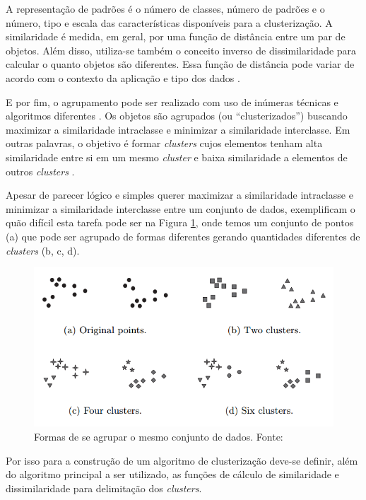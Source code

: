 A representação de padrões é o número de classes, número de padrões e o número, tipo e escala
das características disponíveis para a clusterização.
A similaridade é medida, em geral, por uma função de distância entre um par de objetos. Além disso, utiliza-se também
o conceito inverso de dissimilaridade para calcular o quanto objetos são diferentes. Essa função de distância pode variar de acordo 
com o contexto da aplicação e tipo dos dados \cite{clustering_review}. 

E por fim, o agrupamento pode ser realizado com uso de inúmeras técnicas e algoritmos diferentes \cite{clustering_review}.
Os objetos são agrupados (ou ``clusterizados'') buscando maximizar a similaridade intraclasse e minimizar a similaridade interclasse.
Em outras palavras, o objetivo é formar \textit{clusters} cujos elementos tenham alta similaridade entre si em um mesmo \textit{cluster} 
e baixa similaridade a elementos de outros \textit{clusters} \cite{han2011data}.

Apesar de parecer lógico e simples querer maximizar a similaridade intraclasse e minimizar a similaridade interclasse entre um conjunto de dados, 
 exemplificam o quão difícil esta tarefa pode ser na Figura \ref{fig:clusters_difficulty}, onde temos um conjunto
de pontos (a) que pode ser agrupado de formas diferentes gerando quantidades diferentes de \textit{clusters} (b, c, d).

\begin{figure}[ht!]
\centering
\includegraphics[scale=0.4]{figuras/clusters_difficulty.png}
\caption{Formas de se agrupar o mesmo conjunto de dados. Fonte: \cite{tan2013data}}
\label{fig:clusters_difficulty}
\end{figure}

Por isso para a construção de um algoritmo de clusterização deve-se definir, além do algoritmo principal a ser utilizado, as funções
de cálculo de similaridade e dissimilaridade para delimitação dos \textit{clusters}.

